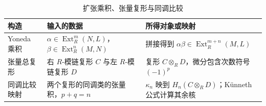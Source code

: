 \begin{table}[htbp]
	\centering
	\caption{扩张乘积、张量复形与同调比较}
	\label{b4:tab:extension-tensor-comparison}
	\begin{tabularx}{\textwidth}{@{}p{}>{\raggedright\arraybackslash}X>{\raggedright\arraybackslash}X@{}}
		\toprule
		构造 & 输入的数据 & 所得对象或映射 \\
		\midrule
		Yoneda 乘积 & \(\alpha\in\operatorname{Ext}_R^m(N,L)\)，\newline \(\beta\in\operatorname{Ext}_R^n(M,N)\) & 拼接得到 \(\alpha\beta\in\operatorname{Ext}_R^{m+n}(M,L)\) \\
		张量总复形 & 右 \(R\)-模链复形 \(C\) 与左 \(R\)-模链复形 \(D\) & 复形 \(C\otimes_R D\)，微分包含次数符号 \((-1)^p\) \\
		同调比较映射 & 两个复形的同调类的张量积，\(p+q=n\) & \(\kappa_n\) 映到 \(H_n(C\otimes_R D)\)；Künneth 公式计算其余核 \\
		\bottomrule
	\end{tabularx}
\end{table}
